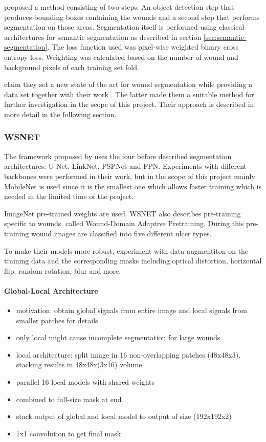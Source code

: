 \citeauthor{Scebba2022} proposed a method consisting of two steps: An object detection step that produces bounding boxes containing the wounds and a second step that performs segmentation on those areas. Segmentation itself is performed using classical architectures for semantic segmentation as described in section \ref{sec:semantic-segmentation}. The loss function used was pixel-wise weighted binary cross entropy loss. Weighting was calculated based on the number of wound and background pixels of each training set fold.

\citeauthor{Oota_2023_WACV} claim they set a new state of the art for wound segmentation while providing a data set together with their work \cite{Oota_2023_WACV}. The latter made them a suitable method for further investigation in the scope of this project. Their approach is described in more detail in the following section.

\subsubsection{WSNET}

The framework proposed by \citeauthor{Oota_2023_WACV} uses the four before described segmentation architectures: U-Net, LinkNet, PSPNet and FPN. Experiments with different backbones were performed in their work, but in the scope of this project mainly MobileNet \cite{howard2017mobilenets} is used since it is the smallest one which allows faster training which is needed in the limited time of the project.

ImageNet pre-trained weights are used. WSNET also describes pre-training specific to wounds, called Wound-Domain Adaptive Pretraining. During this pre-training wound images are classified into five different ulcer types.

To make their models more robust, \citeauthor{Oota_2023_WACV} experiment with data augmentiton on the training data and the corresponding masks including optical distortion, horizontal flip, random rotation, blur and more.

\paragraph{Global-Local Architecture}

\begin{itemize}
	\item motivation: obtain global signals from entire image and local signals from smaller patches for details
	\item only local might cause incomplete segmentation for large wounds
	\item local architecture: split image in 16 non-overlapping patches (48x48x3), stacking results in 48x48x(3x16) volume
	\item parallel 16 local models with shared weights
	\item combined to full-size mask at end
	\item stack output of global and local model to output of size (192x192x2)
	\item 1x1 convolution to get final mask
\end{itemize}

